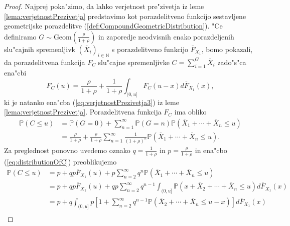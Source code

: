 \documentclass[12pt, a4paper, reqno]{amsart}
\theoremstyle{definition}
\theoremstyle{plain}
\newcommand{\N}{\mathbb{N}}
\newcommand{\Prob}{\mathbb{P}}
\newcommand{\1}{\mathds{1}}
\begin{document}
        \begin{proof}
            Najprej poka"zimo, da lahko verjetnost 
            pre"zivetja iz leme \ref{lema:verjetnostPrezivetja} 
            predstavimo kot porazdelitveno funkcijo sestavljene
            geometrijske porazdelitve (\ref{def:CompoundGeometricDistribution}). "Ce definiramo 
            $G \sim \text{Geom}(\frac{\rho}{1 + \rho})$ in zaporedje neodvisnih enako porazdeljenih 
            slu"cajnih spremenljivk $(\overline{X}_i)_{i\in\N}$ s porazdelitveno funkcijo $\overline{F}_{X_1}$, 
            bomo pokazali, da porazdelitvena funkcija $F_C$ slu"cajne spremenljivke
            $C = \sum_{i=1}^{G}\overline{X}_i$ zado"s"ca ena"cbi 
            \begin{equation}
                F_C(u) = \frac{\rho}{1 + \rho} + \frac{1}{1 + \rho}\int_{(0, u]}F_C(u - x)d\overline{F}_{X_1}(x),
                \label{eq:verjetnostPrezivetja4}
            \end{equation}
            ki je natanko ena"cba (\ref{eq:verjetnostPrezivetja3}) iz leme \ref{lema:verjetnostPrezivetja}.
            Porazdelitvena funkcija $F_C$ ima obliko
            \begin{align}
                \Prob\left(C \leq u\right)  &= \Prob\left(G = 0\right) + \sum_{n = 1}^\infty\Prob\left(G = n\right)\Prob\left(\overline{X}_1 + \cdots + \overline{X}_{n} \leq u\right) \nonumber\\
                                            &= \frac{\rho}{1 + \rho} + \frac{\rho}{1 + \rho}\sum_{n = 1}^\infty\frac{1}{(1 + \rho)^n}\Prob\left(\overline{X}_1 + \cdots + \overline{X}_{n} \leq u\right). \label{eq:distributionOfC}
            \end{align}
            Za preglednost ponovno uvedemo oznako $q= \frac{1}{1 + \rho}$ in 
             $p = \frac{\rho}{1 + \rho}$ in ena"cbo (\ref{eq:distributionOfC}) preoblikujemo 
            \begin{align*}
                \Prob\left(C \leq u\right)  
                    &= p + qp\overline{F}_{X_1}(u) + p\sum_{n = 2}^\infty q^{n}\Prob\left(\overline{X}_1 + \cdots + \overline{X}_{n} \leq u\right) \\
                    &= p + qp\overline{F}_{X_1}(u) + qp\sum_{n = 2}^\infty q^{n-1}\int_{(0, u]}\Prob\left(x + \overline{X}_2 + \cdots + \overline{X}_{n} \leq u\right)d\overline{F}_{X_1}(x) \\
                    &= p + q\int_{(0, u]}p\left[1 + \sum_{n = 2}^\infty q^{n-1}\Prob\left(\overline{X}_2 + \cdots + \overline{X}_n \leq u - x\right)\right]d\overline{F}_{X_1}(x) \\

\end{align*}
\end{proof}
\end{document}

